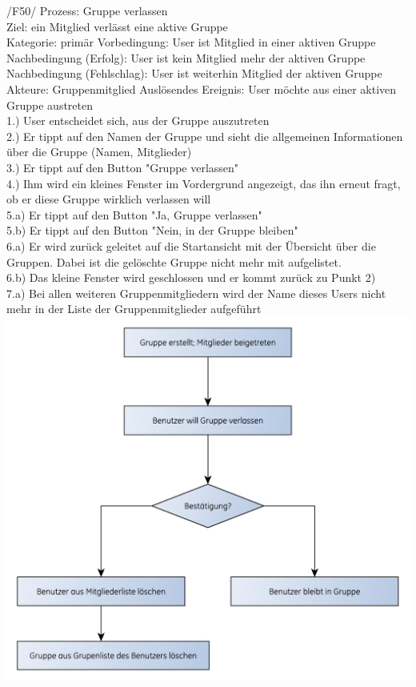 /F50/ Prozess: Gruppe verlassen\\
Ziel: ein Mitglied verlässt eine aktive Gruppe\\
Kategorie: primär
Vorbedingung: User ist Mitglied in einer aktiven Gruppe
Nachbedingung (Erfolg): User ist kein Mitglied mehr der aktiven Gruppe\\
Nachbedingung (Fehlschlag): User ist weiterhin Mitglied der aktiven Gruppe\\
Akteure: Gruppenmitglied
Auslösendes Ereignis: User möchte aus einer aktiven Gruppe austreten\\
1.) User entscheidet sich, aus der Gruppe auszutreten\\
2.) Er tippt auf den Namen der Gruppe und sieht die allgemeinen Informationen über die Gruppe (Namen, Mitglieder)\\
3.) Er tippt auf den Button "Gruppe verlassen"\\
4.) Ihm wird ein kleines Fenster im Vordergrund angezeigt, das ihn erneut fragt, ob er diese Gruppe wirklich verlassen will\\
5.a) Er tippt auf den Button "Ja, Gruppe verlassen"\\
5.b) Er tippt auf den Button "Nein, in der Gruppe bleiben"\\
6.a) Er wird zurück geleitet auf die Startansicht mit der Übersicht über die Gruppen. Dabei ist die gelöschte Gruppe nicht mehr mit aufgelistet.\\
6.b) Das kleine Fenster wird geschlossen und er kommt zurück zu Punkt 2)\\
7.a) Bei allen weiteren Gruppenmitgliedern wird der Name dieses Users nicht mehr in der Liste der Gruppenmitglieder aufgeführt\\

\includegraphics[scale=0.8]{./res/F50_gruppe_verlassen_flowgraph.pdf}

